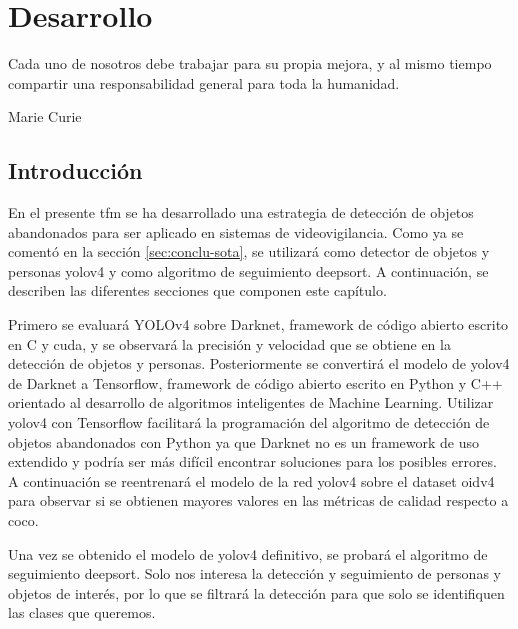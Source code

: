 
\chapter{Desarrollo}
\label{cha:desarrollo}

\begin{FraseCelebre}
  \begin{Frase}
    Cada uno de nosotros debe trabajar para su propia mejora, y al mismo tiempo compartir una responsabilidad general para toda la humanidad.
  \end{Frase}
  \begin{Fuente}
    Marie Curie
  \end{Fuente}
\end{FraseCelebre}

\section{Introducción}
\label{sec:intro-desarrollo}

En el presente \gls{tfm} se ha desarrollado una estrategia de detección de objetos abandonados para ser aplicado en sistemas de videovigilancia. Como ya se comentó en la sección \ref{sec:conclu-sota}, se utilizará como detector de objetos y personas \gls{yolov4} y como algoritmo de seguimiento \gls{deepsort}. A continuación, se describen las diferentes secciones que componen este capítulo.

Primero se evaluará YOLOv4 sobre Darknet, framework de código abierto escrito en C y \gls{cuda}, y se observará la precisión y velocidad que se obtiene en la detección de objetos y personas. Posteriormente se convertirá el modelo de \gls{yolov4} de Darknet a Tensorflow, framework de código abierto escrito en Python y C++ orientado al desarrollo de algoritmos inteligentes de Machine Learning. Utilizar \gls{yolov4} con Tensorflow facilitará la programación del algoritmo de detección de objetos abandonados con Python ya que Darknet no es un framework de uso extendido y podría ser más difícil encontrar soluciones para los posibles errores. A continuación se reentrenará el modelo de la red \gls{yolov4} sobre el dataset \gls{oidv4} para observar si se obtienen mayores valores en las métricas de calidad respecto a \gls{coco}.

Una vez se obtenido el modelo de \gls{yolov4} definitivo, se probará el algoritmo de seguimiento \gls{deepsort}. Solo nos interesa la detección y seguimiento de personas y objetos de interés, por lo que se filtrará la detección para que solo se identifiquen las clases que queremos.

